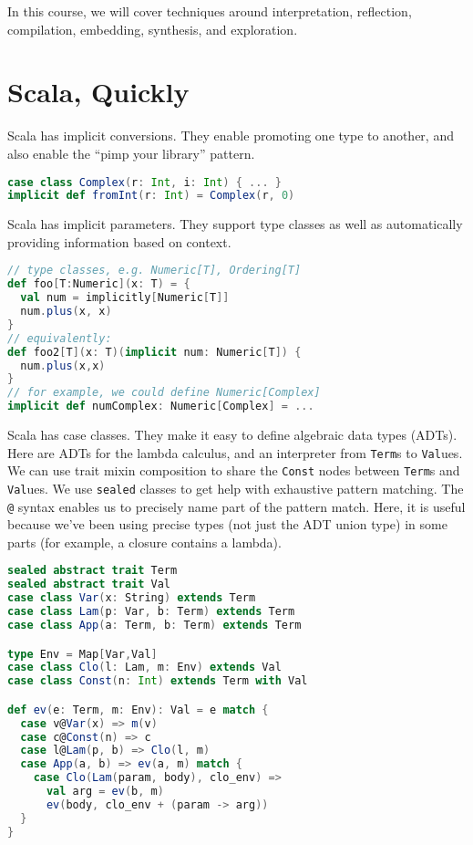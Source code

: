 In this course, we will cover techniques around interpretation,
reflection, compilation, embedding, synthesis, and exploration.

\section{Scala, Quickly}

Scala has implicit conversions. They enable promoting one type to
another, and also enable the ``pimp your library'' pattern.
\begin{lstlisting}[language=Scala]
case class Complex(r: Int, i: Int) { ... }
implicit def fromInt(r: Int) = Complex(r, 0)
\end{lstlisting}

Scala has implicit parameters. They support type classes as well as
automatically providing information based on context.
\begin{lstlisting}[language=Scala]
// type classes, e.g. Numeric[T], Ordering[T]
def foo[T:Numeric](x: T) = {
  val num = implicitly[Numeric[T]]
  num.plus(x, x)
}
// equivalently:
def foo2[T](x: T)(implicit num: Numeric[T]) {
  num.plus(x,x)
}
// for example, we could define Numeric[Complex]
implicit def numComplex: Numeric[Complex] = ...
\end{lstlisting}

Scala has case classes. They make it easy to define algebraic data types (ADTs).
Here are ADTs for the lambda calculus, and an interpreter from {\tt Term}s to {\tt Val}ues.
We can use trait mixin composition to share the {\tt Const} nodes between {\tt Term}s and {\tt Val}ues.
We use {\tt sealed} classes to get help with exhaustive pattern matching.
The {\tt @} syntax enables us to precisely name part of the pattern match.
Here, it is useful because we've been using precise types (not just the ADT union type) in some parts (for example, a closure contains a lambda).
\begin{lstlisting}[language=Scala]
sealed abstract trait Term
sealed abstract trait Val
case class Var(x: String) extends Term
case class Lam(p: Var, b: Term) extends Term
case class App(a: Term, b: Term) extends Term

type Env = Map[Var,Val]
case class Clo(l: Lam, m: Env) extends Val
case class Const(n: Int) extends Term with Val

def ev(e: Term, m: Env): Val = e match {
  case v@Var(x) => m(v)
  case c@Const(n) => c
  case l@Lam(p, b) => Clo(l, m)
  case App(a, b) => ev(a, m) match {
    case Clo(Lam(param, body), clo_env) =>
      val arg = ev(b, m)
      ev(body, clo_env + (param -> arg))
  }
}
\end{lstlisting}

